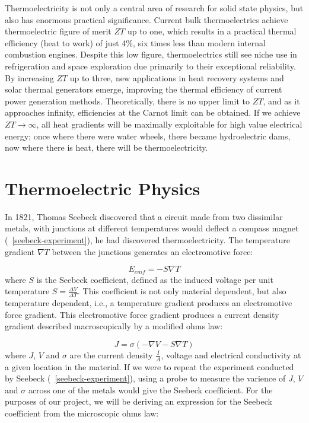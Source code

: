 \documentclass[a4paper,10pt,journal]{IEEEtran}
\newcommand{\figref}[2][\figurename~]{#1\ref{#2}}
\begin{document}
Thermoelectricity is not only a central area of research for solid
state physics, but also has enormous practical significance. Current
bulk thermoelectrics achieve thermoelectric figure of merit $ZT$ up to
one, which results in a practical thermal efficiency (heat to work) of
just 4\%, six times less than modern internal combustion engines.
Despite this low figure, thermoelectrics still see niche use
in refrigeration and space exploration due primarily to their
exceptional reliability. By increasing $ZT$ up to three, new
applications in heat recovery systems and solar thermal generators
emerge, improving the thermal efficiency of current power generation
methods. Theoretically, there is no upper limit to $ZT$, and as it
approaches infinity, efficiencies at the Carnot limit can be obtained.
If we achieve $ZT \to\infty$, all heat gradients will be maximally
exploitable for high value electrical energy; once where there were
water wheels, there became hydroelectric dams, now where there is
heat, there will be thermoelectricity.

\section{Thermoelectric Physics}
In 1821, Thomas Seebeck discovered that a circuit made from two
dissimilar metals, with junctions at different temperatures would
deflect a compass magnet (\figref{seebeck-experiment}), he had
discovered thermoelectricity. The temperature gradient $\nabla
T$ between the junctions generates an electromotive force:

\begin{equation}
\label{seebeck-emf}
	E_{emf} = -S \nabla T
\end{equation}
where $S$ is the Seebeck coefficient, defined as the induced voltage per
unit temperature $S = \frac{\Delta V}{\Delta T}$. This coefficient is
not only material dependent, but also temperature dependent, i.e., a
temperature gradient produces an electromotive force gradient. This
electromotive force gradient produces a current density gradient
described macroscopically by a modified ohms law:

\begin{equation}
\label{current-density}
	J = \sigma (-\nabla V - S \nabla T)
\end{equation}
where $J$, $V$ and $\sigma$ are the current density $\frac{I}{A}$,
voltage and electrical conductivity at a given location in the
material. If we were to repeat the experiment conducted by Seebeck
(\figref{seebeck-experiment}), using a probe to measure the varience
of $J$, $V$ and $\sigma$ across one of the metals would give the
Seebeck coefficient.
For the purposes of our project, we will be deriving an expression for
the Seebeck coefficient from the microscopic ohms law:
\end{document}
